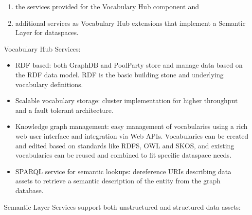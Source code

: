 \documentclass[
  super,
  preprint,
  3p]{elsarticle}
\providecommand{\tightlist}{%
  \setlength{\itemsep}{0pt}\setlength{\parskip}{0pt}}\usepackage{longtable,booktabs,array}
\begin{document}
\begin{enumerate}
\def\labelenumi{\roman{enumi})}
\tightlist
\item
  the services provided for the Vocabulary Hub component and
\item
  additional services as Vocabulary Hub extensions that implement a
  Semantic Layer for dataspaces.
\end{enumerate}

Vocabulary Hub Services:

\begin{itemize}
\tightlist
\item
  RDF based: both GraphDB and PoolParty store and manage data based on
  the RDF data model. RDF is the basic building stone and underlying
  vocabulary definitions.
\item
  Scalable vocabulary storage: cluster implementation for higher
  throughput and a fault tolerant architecture.
\item
  Knowledge graph management: easy management of vocabularies using a
  rich web user interface and integration via Web APIs. Vocabularies can
  be created and edited based on standards like RDFS, OWL and SKOS, and
  existing vocabularies can be reused and combined to fit specific
  dataspace needs.
\item
  SPARQL service for semantic lookups: dereference URIs describing data
  assets to retrieve a semantic description of the entity from the graph
  database.
\end{itemize}

Semantic Layer Services support both unstructured and structured data
assets:
\end{document}
